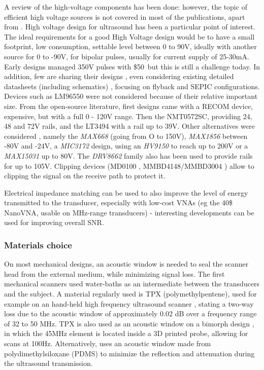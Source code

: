 \documentclass{article}
\begin{document}
A review of the high-voltage components has been done: however, the topic of efficient high voltage sources is not covered in most of the publications, apart from \cite{xiao_design_2013}. High voltage design for ultrasound has been a particular point of interest. The ideal requirements for a good High Voltage design would be to have a small footprint, low consumption, settable level between 0 to 90V, ideally with another source for 0 to -90V, for bipolar pulses, usually for current supply of 25-30mA.  Early designs \cite{brown_low-cost_2002} managed 350V pulses with \$50\, but this is still a challenge today. In addition, few are sharing their designs \cite{tang_computerized_2014}, even considering existing detailed datasheets (including schematics) \cite{granata_designing_2020}, focusing on flyback and SEPIC configurations. Devices such as LM96550 were not considered because of their relative important size. From the open-source literature, first designs came with a RECOM device, expensive, but with a full 0 - 120V range. Then the NMT0572SC, providing 24, 48 and 72V rails, and the LT3494 with a rail up to 39V. Other alternatives were considered , namely the \emph{MAX668} (going from O to 150V), \emph{MAX1856} between -80V and -24V, a \emph{MIC3172} design, using an \emph{HV9150} to reach up to 200V or a \emph{MAX15031} up to 80V. The \emph{DRV8662} family also has been used to provide rails for up to 105V. Clipping devices (MD0100 \cite{li_new_2014,sharma_development_2015}, MMBD4148/MMBD3004 \cite{ching_chu_designing_nodate}) allow to clipping the signal on the receive path to protect it.

Electrical impedance matching \cite{sharma_development_2015} can be used to also improve the level of energy transmitted to the transducer, especially with low-cost VNAs (eg the 40\$ NanoVNA, usable on MHz-range transducers) - interesting developments \cite{garcia-rodriguez_low_2010,wei_design_2020} can be used for improving overall SNR.

\subsubsection{Materials choice}

On most mechanical designs, an acoustic window is needed to seal the scanner head from the external medium, while minimizing signal loss. The first mechanical scanners used water-baths \cite{schueler_fundamentals_1984} as an intermediate between the transducers and the subject. A material regularly used is TPX (polymethylpentene), used for example on an hand-held high frequency ultrasound scanner \cite{erickson_hand-held_2001}, stating a two-way loss due to the acoustic window of approximately 0.02 dB over a frequency range of 32 to 50 MHz. TPX is also used as an acoustic window on a bimorph design \cite{brown_low_2013}, in which the 45MHz element is located inside a 3D printed probe, allowing for scans at 100Hz. Alternatively, \cite{qiu_ultrasound_2020} uses an acoustic window made from polydimethylsiloxane (PDMS) to minimize the reflection and
attenuation during the ultrasound transmission.
\end{document}

